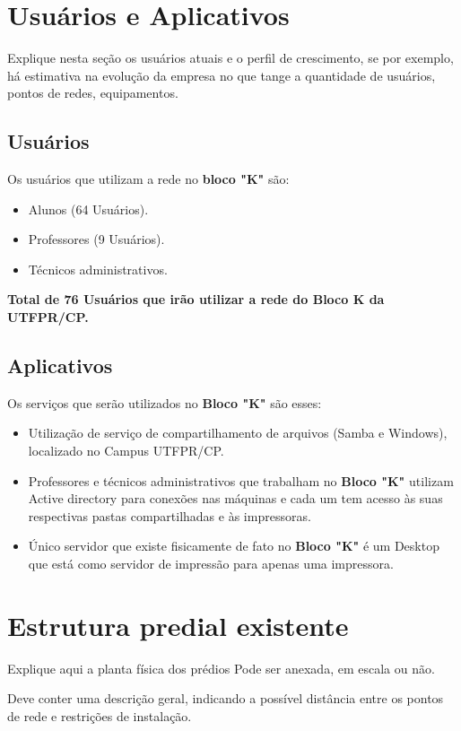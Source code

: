 \documentclass[	DIV=calc,%
							paper=a4,%
							fontsize=12pt,%
							onecolumn]{scrartcl}	 					%
\begin{document}
\section{Usuários e Aplicativos}
Explique nesta seção os usuários atuais e o perfil de crescimento, se por exemplo, há estimativa na evolução da empresa no que tange a quantidade de usuários, pontos de redes, equipamentos.
 

\subsection{Usuários}
Os usuários que utilizam a rede no \textbf{bloco "K"} são:
\begin{itemize}
\item Alunos (64 Usuários).
\item Professores (9 Usuários).
\item Técnicos administrativos.
\end{itemize}
\textbf{Total de 76 Usuários que irão utilizar a rede do Bloco K da UTFPR/CP.}

\subsection{Aplicativos}
Os serviços que serão utilizados no \textbf{Bloco "K"} são esses: 
\begin{itemize}
\item Utilização de serviço de compartilhamento de arquivos (Samba e Windows), localizado no Campus UTFPR/CP.
\item Professores e  técnicos administrativos que trabalham no \textbf{Bloco "K"} utilizam Active directory para conexões nas máquinas e cada um tem acesso às suas respectivas pastas compartilhadas e às impressoras.
\item Único servidor que existe fisicamente de fato no \textbf{Bloco "K"} é um Desktop que está como servidor de impressão para apenas uma impressora.
\end{itemize}

\section{Estrutura predial existente}

Explique aqui a planta física dos prédios
Pode ser anexada, em escala ou não.

Deve conter uma descrição geral, indicando a possível distância entre os pontos de rede e restrições de instalação.
\end{document}
